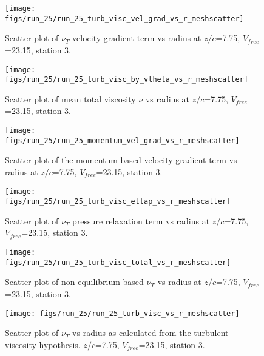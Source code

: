 \begin{figure}[H]
\centering
\texttt{[image: figs/run\_25/run\_25\_turb\_visc\_vel\_grad\_vs\_r\_meshscatter]}
\caption{Scatter plot of $\nu_T$ velocity gradient term vs radius at $z/c$=7.75, $V_{free}$=23.15, station 3.}
\end{figure}


\begin{figure}[H]
\centering
\texttt{[image: figs/run\_25/run\_25\_turb\_visc\_by\_vtheta\_vs\_r\_meshscatter]}
\caption{Scatter plot of mean total viscosity $\nu$ vs radius at $z/c$=7.75, $V_{free}$=23.15, station 3.}
\end{figure}


\begin{figure}[H]
\centering
\texttt{[image: figs/run\_25/run\_25\_momentum\_vel\_grad\_vs\_r\_meshscatter]}
\caption{Scatter plot of the momentum based velocity gradient term vs radius at $z/c$=7.75, $V_{free}$=23.15, station 3.}
\end{figure}


\begin{figure}[H]
\centering
\texttt{[image: figs/run\_25/run\_25\_turb\_visc\_ettap\_vs\_r\_meshscatter]}
\caption{Scatter plot of $\nu_T$ pressure relaxation term vs radius at $z/c$=7.75, $V_{free}$=23.15, station 3.}
\end{figure}


\begin{figure}[H]
\centering
\texttt{[image: figs/run\_25/run\_25\_turb\_visc\_total\_vs\_r\_meshscatter]}
\caption{Scatter plot of non-equilibrium based $\nu_T$ vs radius at $z/c$=7.75, $V_{free}$=23.15, station 3.}
\end{figure}


\begin{figure}[H]
\centering
\texttt{[image: figs/run\_25/run\_25\_turb\_visc\_vs\_r\_meshscatter]}
\caption{Scatter plot of $\nu_T$ vs radius as calculated from the turbulent viscosity hypothesis. $z/c$=7.75, $V_{free}$=23.15, station 3.}
\end{figure}



